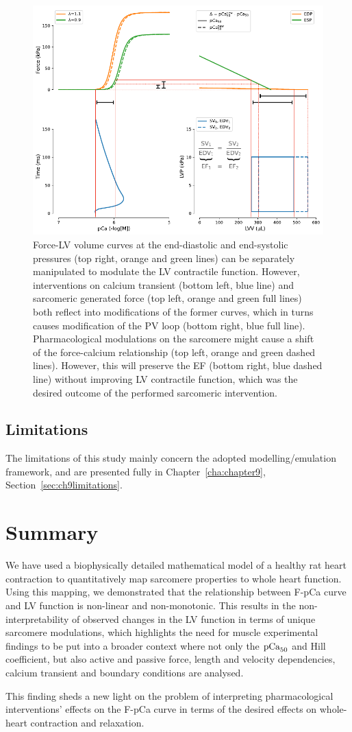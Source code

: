\begin{figure}[ht!]
    \myfloatalign
    \includegraphics[width=\textwidth]{figures/chapter08/Fig7.pdf}
    \caption{Force-LV volume curves at the end-diastolic and end-systolic pressures (top right, orange and green lines) can be separately manipulated to modulate the LV contractile function. However, interventions on calcium transient (bottom left, blue line) and sarcomeric generated force (top left, orange and green full lines) both reflect into modifications of the former curves, which in turns causes modification of the PV loop (bottom right, blue full line). Pharmacological modulations on the sarcomere might cause a shift of the force-calcium relationship (top left, orange and green dashed lines). However, this will preserve the EF (bottom right, blue dashed line) without improving LV contractile function, which was the desired outcome of the performed sarcomeric intervention.}
    \label{fig:schematic}
\end{figure}


%
%
%
\subsection{Limitations}\label{sec:ch8limitations}
The limitations of this study mainly concern the adopted modelling/emulation framework, and are presented fully in Chapter~\ref{cha:chapter9}, Section~\ref{sec:ch9limitations}.

%
%
%
\section{Summary}\label{sec:ch8summary}
We have used a biophysically detailed mathematical model of a healthy rat heart contraction to quantitatively map sarcomere properties to whole heart function. Using this mapping, we demonstrated that the relationship between F-pCa curve and LV function is non-linear and non-monotonic. This results in the non-interpretability of observed changes in the LV function in terms of unique sarcomere modulations, which highlights the need for muscle experimental findings to be put into a broader context where not only the $\textrm{pCa}_{50}$ and Hill coefficient, but also active and passive force, length and velocity dependencies, calcium transient and boundary conditions are analysed.

This finding sheds a new light on the problem of interpreting pharmacological interventions' effects on the F-pCa curve in terms of the desired effects on whole-heart contraction and relaxation.